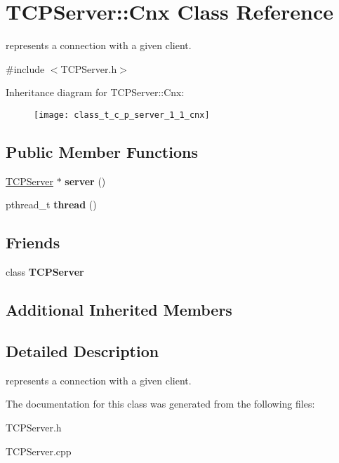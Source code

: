 \hypertarget{class_t_c_p_server_1_1_cnx}{\section{T\-C\-P\-Server\-:\-:Cnx Class Reference}
\label{class_t_c_p_server_1_1_cnx}
}


represents a connection with a given client.  




{\ttfamily \#include $<$T\-C\-P\-Server.\-h$>$}

Inheritance diagram for T\-C\-P\-Server\-:\-:Cnx\-:\begin{figure}[H]
\begin{center}
\leavevmode
\texttt{[image: class\_t\_c\_p\_server\_1\_1\_cnx]}
\end{center}
\end{figure}
\subsection*{Public Member Functions}
\begin{DoxyCompactItemize}
\item 
\hypertarget{class_t_c_p_server_1_1_cnx_affe5198f5dca75da9f651e286a289b47}{\hyperlink{class_t_c_p_server}{T\-C\-P\-Server} $\ast$ {\bfseries server} ()}\label{class_t_c_p_server_1_1_cnx_affe5198f5dca75da9f651e286a289b47}

\item 
\hypertarget{class_t_c_p_server_1_1_cnx_a3dd1fff38f6463d62ef5f3cae4fad340}{pthread\-\_\-t {\bfseries thread} ()}\label{class_t_c_p_server_1_1_cnx_a3dd1fff38f6463d62ef5f3cae4fad340}

\end{DoxyCompactItemize}
\subsection*{Friends}
\begin{DoxyCompactItemize}
\item 
\hypertarget{class_t_c_p_server_1_1_cnx_ae4cfdb1814d91a8d28dadb49adda68f0}{class {\bfseries T\-C\-P\-Server}}\label{class_t_c_p_server_1_1_cnx_ae4cfdb1814d91a8d28dadb49adda68f0}

\end{DoxyCompactItemize}
\subsection*{Additional Inherited Members}


\subsection{Detailed Description}
represents a connection with a given client. 

The documentation for this class was generated from the following files\-:\begin{DoxyCompactItemize}
\item 
T\-C\-P\-Server.\-h\item 
T\-C\-P\-Server.\-cpp\end{DoxyCompactItemize}
